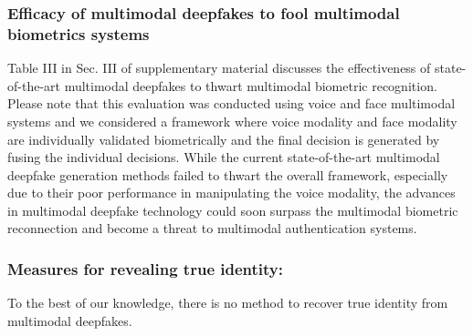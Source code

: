 \subsubsection{Efficacy of multimodal deepfakes to fool multimodal biometrics systems}
Table III in Sec. III of supplementary material discusses the effectiveness of state-of-the-art multimodal deepfakes to thwart multimodal biometric recognition. Please note that this evaluation was conducted using voice and face multimodal systems and we considered a framework where voice modality and face modality are individually validated biometrically and the final decision is generated by fusing the individual decisions. While the current state-of-the-art multimodal deepfake generation methods failed to thwart the overall framework, especially due to their poor performance in manipulating the voice modality, the advances in multimodal deepfake technology could soon surpass the multimodal biometric reconnection and become a threat to multimodal authentication systems.


\subsubsection{Measures for revealing true identity:} To the best of our knowledge, there is no method to recover true identity from multimodal deepfakes. 





